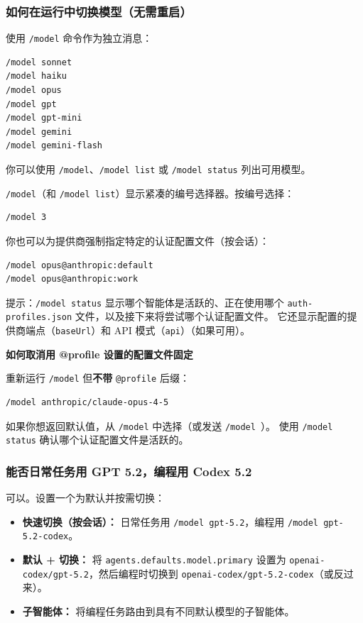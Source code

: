 \subsubsection{如何在运行中切换模型（无需重启）}


使用 \texttt{/model} 命令作为独立消息：

\begin{lstlisting}
/model sonnet
/model haiku
/model opus
/model gpt
/model gpt-mini
/model gemini
/model gemini-flash
\end{lstlisting}


你可以使用 \texttt{/model}、\texttt{/model list} 或 \texttt{/model status} 列出可用模型。

\texttt{/model}（和 \texttt{/model list}）显示紧凑的编号选择器。按编号选择：

\begin{lstlisting}
/model 3
\end{lstlisting}


你也可以为提供商强制指定特定的认证配置文件（按会话）：

\begin{lstlisting}
/model opus@anthropic:default
/model opus@anthropic:work
\end{lstlisting}


提示：\texttt{/model status} 显示哪个智能体是活跃的、正在使用哪个 \texttt{auth-profiles.json} 文件，以及接下来将尝试哪个认证配置文件。
它还显示配置的提供商端点（\texttt{baseUrl}）和 API 模式（\texttt{api}）（如果可用）。

\textbf{如何取消用 @profile 设置的配置文件固定}

重新运行 \texttt{/model} 但\textbf{不带} \texttt{@profile} 后缀：

\begin{lstlisting}
/model anthropic/claude-opus-4-5
\end{lstlisting}


如果你想返回默认值，从 \texttt{/model} 中选择（或发送 \texttt{/model }）。
使用 \texttt{/model status} 确认哪个认证配置文件是活跃的。

\subsubsection{能否日常任务用 GPT 5.2，编程用 Codex 5.2}


可以。设置一个为默认并按需切换：

\begin{itemize}
  \item \textbf{快速切换（按会话）：} 日常任务用 \texttt{/model gpt-5.2}，编程用 \texttt{/model gpt-5.2-codex}。
  \item \textbf{默认 + 切换：} 将 \texttt{agents.defaults.model.primary} 设置为 \texttt{openai-codex/gpt-5.2}，然后编程时切换到 \texttt{openai-codex/gpt-5.2-codex}（或反过来）。
  \item \textbf{子智能体：} 将编程任务路由到具有不同默认模型的子智能体。
\end{itemize}



